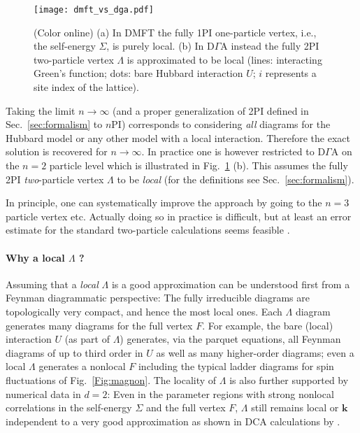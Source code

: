 \documentclass[rmp,aps,reprint,amsmath,amssymb,superscriptaddress,showpacs,nofootinbib]{revtex4-1}
\begin{document}
\begin{figure}[t!]
 \centering
 \texttt{[image: dmft\_vs\_dga.pdf]}
  \caption{(Color online) (a) In DMFT the fully 1PI one-particle vertex, i.e., the self-energy $\Sigma$, is purely local. (b) In D$\Gamma$A instead the fully 2PI two-particle vertex $\Lambda$ is approximated to be local (lines: interacting Green's function; dots: bare Hubbard interaction $U$; $i$ represents a site index of the lattice).}
 \label{fig:dmftvsdga}
\end{figure}

Taking the limit $n \rightarrow \infty$  (and a proper generalization of 2PI defined in Sec.~\ref{sec:formalism} to  $n$PI) corresponds to considering {\sl all} diagrams for the Hubbard model or any other model with a local interaction. Therefore the exact solution is recovered for  $n \rightarrow \infty$.
In practice one is however restricted to D$\Gamma$A on the $n=2$ particle level which is  illustrated  in Fig.~\ref{fig:dmftvsdga} (b). 
This assumes the fully 2PI {\em two}-particle vertex  $\Lambda$ to be {\em local} (for the definitions see Sec.~\ref{sec:formalism}).

In principle, one can systematically improve the approach by going to the  $n=3$ particle vertex etc. Actually doing so in practice is difficult, but at least  an error estimate for the standard two-particle calculations seems feasible  \cite{Ribic2017b}.

\paragraph*{Why a local  \texorpdfstring{$\Lambda$}{Lambda} ?}
Assuming that a {\em local}   $\Lambda$ is a good approximation can be understood first from a Feynman diagrammatic perspective: The fully irreducible diagrams are topologically very compact, and hence the most local ones. Each   $\Lambda$ diagram generates many diagrams for the full vertex $F$.  For example, the bare (local) interaction $U$ (as part of  $\Lambda$) generates, via the parquet equations, all Feynman diagrams of up to third order in $U$ as well as many higher-order diagrams; even a local  $\Lambda$ generates a nonlocal $F$ including the typical ladder diagrams for spin fluctuations of Fig.~\ref{Fig:magnon}. The locality of $\Lambda$  is also further supported by numerical data in $d=2$: Even in the parameter regions with strong nonlocal correlations in the self-energy $\Sigma$ and the full vertex $F$,  $\Lambda$ still remains local or ${\mathbf k}$ independent to a very good approximation as shown in DCA calculations by . 
\end{document}
